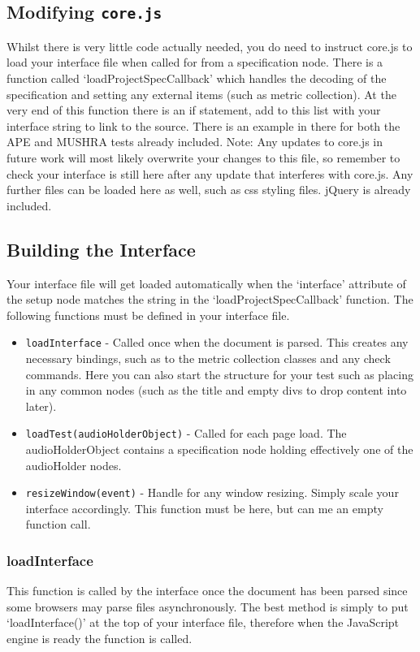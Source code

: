 \documentclass[11pt, oneside]{article}   	%
\begin{document}
	\subsection{Modifying \texttt{core.js}}
		Whilst there is very little code actually needed, you do need to instruct core.js to load your interface file when called for from a specification node. There is a function called `loadProjectSpecCallback' which handles the decoding of the specification and setting any external items (such as metric collection). At the very end of this function there is an if statement, add to this list with your interface string to link to the source. There is an example in there for both the APE and MUSHRA tests already included. Note: Any updates to core.js in future work will most likely overwrite your changes to this file, so remember to check your interface is still here after any update that interferes with core.js.
		Any further files can be loaded here as well, such as css styling files. jQuery is already included.

	\subsection{Building the Interface}
		Your interface file will get loaded automatically when the `interface' attribute of the setup node matches the string in the `loadProjectSpecCallback' function. The following functions must be defined in your interface file.
		\begin{itemize}
		\item \texttt{loadInterface} - Called once when the document is parsed. This creates any necessary bindings, such as to the metric collection classes and any check commands. Here you can also start the structure for your test such as placing in any common nodes (such as the title and empty divs to drop content into later).
		\item \texttt{loadTest(audioHolderObject)} - Called for each page load. The audioHolderObject contains a specification node holding effectively one of the audioHolder nodes.
		\item \texttt{resizeWindow(event)} - Handle for any window resizing. Simply scale your interface accordingly. This function must be here, but can me an empty function call.
		\end{itemize}

		\subsubsection{loadInterface}
			This function is called by the interface once the document has been parsed since some browsers may parse files asynchronously. The best method is simply to put `loadInterface()' at the top of your interface file, therefore when the JavaScript engine is ready the function is called.
\end{document}
